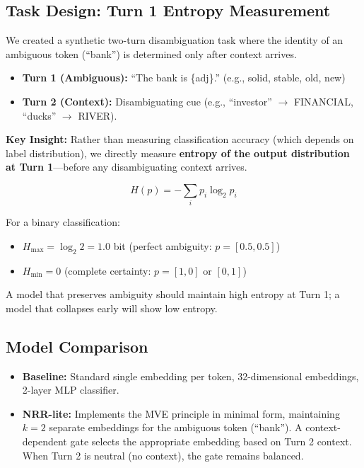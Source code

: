 \documentclass[11pt,a4paper]{article}
\begin{document}
\subsection{Task Design: Turn 1 Entropy Measurement}

We created a synthetic two-turn disambiguation task where the identity of an ambiguous token (``bank'') is determined only after context arrives.
\begin{itemize}
    \item \textbf{Turn 1 (Ambiguous):} ``The bank is \{adj\}.'' (e.g., solid, stable, old, new)
    \item \textbf{Turn 2 (Context):} Disambiguating cue (e.g., ``investor'' $\to$ FINANCIAL, ``ducks'' $\to$ RIVER).
\end{itemize}

\textbf{Key Insight:} Rather than measuring classification accuracy (which depends on label distribution), we directly measure \textbf{entropy of the output distribution at Turn 1}---before any disambiguating context arrives.

\begin{equation}
H(p) = -\sum_{i} p_i \log_2 p_i
\end{equation}

For a binary classification:
\begin{itemize}
    \item $H_{\max} = \log_2 2 = 1.0$ bit (perfect ambiguity: $p = [0.5, 0.5]$)
    \item $H_{\min} = 0$ (complete certainty: $p = [1, 0]$ or $[0, 1]$)
\end{itemize}

A model that preserves ambiguity should maintain high entropy at Turn 1; a model that collapses early will show low entropy.

\subsection{Model Comparison}

\begin{itemize}
    \item \textbf{Baseline:} Standard single embedding per token, 32-dimensional embeddings, 2-layer MLP classifier.
    \item \textbf{NRR-lite:} Implements the MVE principle in minimal form, maintaining $k=2$ separate embeddings for the ambiguous token (``bank''). A context-dependent gate selects the appropriate embedding based on Turn 2 context. When Turn 2 is neutral (no context), the gate remains balanced.
\end{itemize}
\end{document}
